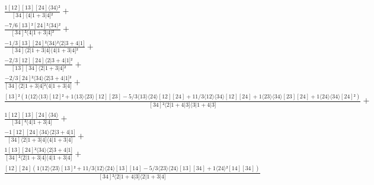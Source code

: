 \documentclass[varwidth, border=5pt]{standalone}
\begin{document}
\begin{my}
$\begin{gathered}
\scriptscriptstyle\frac{1[12][13][24]⟨34⟩²}{[34]⟨4|1+3|4]²} +\\
\scriptscriptstyle\frac{-7/6[13]²[24]²⟨34⟩²}{[34]²⟨4|1+3|4]²} +\\
\scriptscriptstyle\frac{-1/3[13][24]²⟨34⟩²⟨2|3+4|1]}{[34]⟨2|1+3|4]⟨4|1+3|4]²} +\\
\scriptscriptstyle\frac{-2/3[12][24]⟨2|3+4|1]²}{[13][34]⟨2|1+3|4]²} +\\
\scriptscriptstyle\frac{-2/3[24]²⟨34⟩⟨2|3+4|1]²}{[34]⟨2|1+3|4]²⟨4|1+3|4]} +\\
\scriptscriptstyle\frac{[13]²(1⟨12⟩⟨13⟩[12]²+1⟨13⟩⟨23⟩[12][23]-5/3⟨13⟩⟨24⟩[12][24]+11/3⟨12⟩⟨34⟩[12][24]+1⟨23⟩⟨34⟩[23][24]+1⟨24⟩⟨34⟩[24]²)}{[34]²⟨2|1+4|3]⟨3|1+4|3]} +\\
\scriptscriptstyle\frac{1[12][13][24]⟨34⟩}{[34]²⟨4|1+3|4]} +\\
\scriptscriptstyle\frac{-1[12][24]⟨34⟩⟨2|3+4|1]}{[34]⟨2|1+3|4]⟨4|1+3|4]} +\\
\scriptscriptstyle\frac{1[13][24]²⟨34⟩⟨2|3+4|1]}{[34]²⟨2|1+3|4]⟨4|1+3|4]} +\\
\scriptscriptstyle\frac{[12][24](1⟨12⟩⟨23⟩[13]²+11/3⟨12⟩⟨24⟩[13][14]-5/3⟨23⟩⟨24⟩[13][34]+1⟨24⟩²[14][34])}{[34]²⟨2|1+4|3]⟨2|1+3|4]} \phantom{+}
\end{gathered}$
\end{my}
\end{document}
